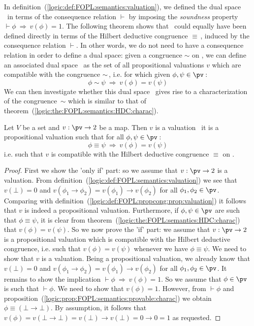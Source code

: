 In definition~(\ref{logic:def:FOPL:semantics:valuation}), we defined
the dual space \pvd\ in terms of the consequence relation $\vdash$
by imposing the {\em soundness} property $\vdash\phi\ \Rightarrow\
v(\phi)=1$. The following theorem shows that \pvd\ could equally
have been defined directly in terms of the Hilbert deductive
congruence $\equiv$\,, induced by the consequence relation $\vdash$.
In other words, we do not need to have a consequence relation in
order to define a dual space: given a congruence $\sim$ on \pv, we
can define an associated dual space \pvd\ as the set of all
propositional valuations $v$ which are compatible with the
congruence $\sim$\,, i.e. for which given $\phi,\psi\in\pv$\,:
    \[
    \phi\sim\psi\ \Rightarrow\ v(\phi)=v(\psi)
    \]
We can then investigate whether this dual space \pvd\ gives rise to
a characterization of the congruence~$\sim$ which is similar to that
of theorem~(\ref{logic:the:FOPL:semantics:HDC:charac}).

 \index{dual@Dual
and deductive congruence}
\begin{theorem}\label{logic:the:FOPL:semantics:valuation:charac}
Let $V$ be a set and $v:\pv\to 2$ be a map. Then $v$ is a valuation
\ifand\ it is a propositional valuation such that for all
$\phi,\psi\in\pv$\,:
    \[
    \phi\equiv\psi\ \Rightarrow\ v(\phi)=v(\psi)
    \]
i.e. such that $v$ is compatible with the Hilbert deductive
congruence $\equiv$ on \pv.
\end{theorem}
\begin{proof}
First we show the 'only if' part: so we assume that $v:\pv\to 2$ is
a valuation. From
definition~(\ref{logic:def:FOPL:semantics:valuation}) we see that
$v(\bot)=0$ and $v(\phi_{1}\to\phi_{2})=v(\phi_{1})\to v(\phi_{2})$
for all $\phi_{1},\phi_{2}\in\pv$. Comparing with
definition~(\ref{logic:def:FOPL:propcong:prop:valuation}) it follows
that $v$ is indeed a propositional valuation. Furthermore, if
$\phi,\psi\in\pv$ are such that $\phi\equiv\psi$, it is clear from
theorem~(\ref{logic:the:FOPL:semantics:HDC:charac}) that
$v(\phi)=v(\psi)$. So we now prove the 'if' part: we assume that
$v:\pv\to 2$ is a propositional valuation which is compatible with
the Hilbert deductive congruence, i.e. such that $v(\phi)=v(\psi)$
whenever we have $\phi\equiv\psi$. We need to show that $v$ is a
valuation. Being a propositional valuation, we already know that
$v(\bot)=0$ and $v(\phi_{1}\to\phi_{2})=v(\phi_{1})\to v(\phi_{2})$
for all $\phi_{1},\phi_{2}\in\pv$. It remains to show the
implication $\vdash\phi\ \Rightarrow\ v(\phi)=1$. So we assume that
$\phi\in\pv$ is such that $\vdash\phi$. We need to show that
$v(\phi)=1$. However, from $\vdash\phi$ and
proposition~(\ref{logic:prop:FOPL:semantics:provable:charac}) we
obtain $\phi\equiv(\bot\to\bot)$. By assumption, it follows that
$v(\phi)=v(\bot\to\bot)= v(\bot)\to v(\bot)=0\to 0=1$ as requested.
\end{proof}
